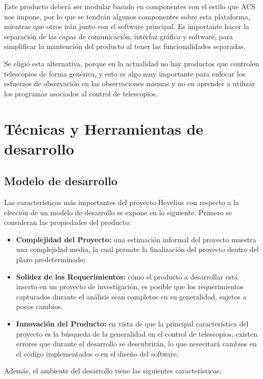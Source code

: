 \documentclass[letterpaper,titlepage,spanish,10pt]{article}
\begin{document}
Este producto deber\'a ser modular basado en componentes con el estilo que ACS nos
impone, por lo que se tendr\'an algunos componentes sobre esta plataforma, mientras que
otros ir\'an junto con el software principal. Es importante hacer la separaci\'on
de las capas de comunicaci\'on, interfaz gr\'afica y software, para simplificar la
mantenci\'on del producto al tener las funcionalidades separadas.

Se eligi\'o esta alternativa, porque en la actualidad no hay productos que controlen
telescopios de forma gen\'erica, y esto es algo muy importante para enfocar los esfuerzos
de observaci\'on en las observaciones mismas y no en aprender a utilizar los programas
asociados al control de telescopios.


\newpage
\section{T\'ecnicas y Herramientas de desarrollo} %
\subsection{Modelo de desarrollo}
Las caracter\'isticas m\'as importantes del proyecto Hevelius con
respecto a la elecci\'on de un modelo de desarrollo se expone en lo
siguiente. Primero se consideran las propiedades del producto:

\begin{itemize}
\item \textbf{Complejidad del Proyecto:} una estimaci\'on informal del proyecto
  muestra una complejidad media, la cual permite la finalizaci\'on del
  proyecto dentro del plazo predeterminado;
\item \textbf{Solidez de los Requerimientos:} c\'omo el producto a
  desarrollar est\'a inserto en un proyecto de investigaci\'on, es posible que
  los requerimientos capturados durante el an\'alisis sean completos en su generalidad,
  sujetos a pocos cambios.
\item \textbf{Innovaci\'on del Producto:} en vista de que la principal caracter\'istica
  del proyecto es la b\'usqueda de la generalidad en el control de telescopios, existen 
  errores que durante el desarrollo se descubrir\'an, lo que nesecitar\'a cambios en el
  c\'odigo implementados o en el dise\~no del software.
\end{itemize}

Adem\'as, el ambiente del desarrollo tiene las siguientes caracter\'isticas:
\end{document}
